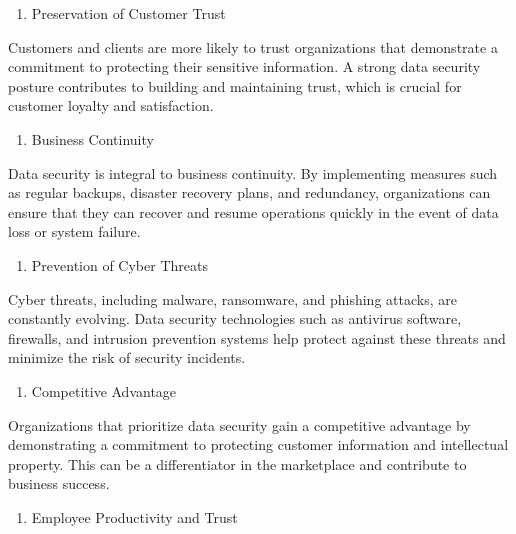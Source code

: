 \documentclass[
  letterpaper,
  DIV=11,
  numbers=noendperiod]{scrreprt}
\providecommand{\tightlist}{%
  \setlength{\itemsep}{0pt}\setlength{\parskip}{0pt}}\usepackage{longtable,booktabs,array}
\begin{document}
\begin{enumerate}
\def\labelenumi{\arabic{enumi}.}
\setcounter{enumi}{5}
\tightlist
\item
  Preservation of Customer Trust
\end{enumerate}

Customers and clients are more likely to trust organizations that
demonstrate a commitment to protecting their sensitive information. A
strong data security posture contributes to building and maintaining
trust, which is crucial for customer loyalty and satisfaction.

\begin{enumerate}
\def\labelenumi{\arabic{enumi}.}
\setcounter{enumi}{6}
\tightlist
\item
  Business Continuity
\end{enumerate}

Data security is integral to business continuity. By implementing
measures such as regular backups, disaster recovery plans, and
redundancy, organizations can ensure that they can recover and resume
operations quickly in the event of data loss or system failure.

\begin{enumerate}
\def\labelenumi{\arabic{enumi}.}
\setcounter{enumi}{7}
\tightlist
\item
  Prevention of Cyber Threats
\end{enumerate}

Cyber threats, including malware, ransomware, and phishing attacks, are
constantly evolving. Data security technologies such as antivirus
software, firewalls, and intrusion prevention systems help protect
against these threats and minimize the risk of security incidents.

\begin{enumerate}
\def\labelenumi{\arabic{enumi}.}
\setcounter{enumi}{8}
\tightlist
\item
  Competitive Advantage
\end{enumerate}

Organizations that prioritize data security gain a competitive advantage
by demonstrating a commitment to protecting customer information and
intellectual property. This can be a differentiator in the marketplace
and contribute to business success.

\begin{enumerate}
\def\labelenumi{\arabic{enumi}.}
\setcounter{enumi}{9}
\tightlist
\item
  Employee Productivity and Trust
\end{enumerate}
\end{document}
